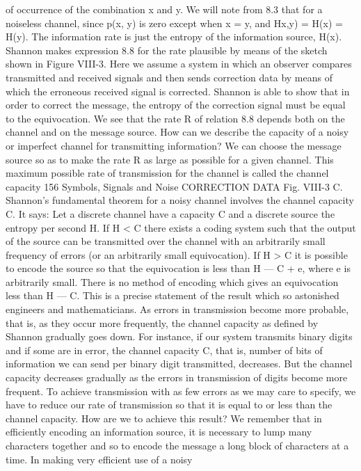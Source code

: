 {{{{{{{{of occurrence of the combination x and y. We will note from
8.3 that for a noiseless channel, since p(x, y) is zero except when
x = y, and H{x,y) = H(x) = H(y). The information rate is just
the entropy of the information source, H(x).
Shannon makes expression 8.8 for the rate plausible by means
of the sketch shown in Figure VIII-3. Here we assume a system in
which an observer compares transmitted and received signals and
then sends correction data by means of which the erroneous
received signal is corrected. Shannon is able to show that in order
to correct the message, the entropy of the correction signal must
be equal to the equivocation.
We see that the rate R of relation 8.8 depends both on the
channel and on the message source. How can we describe the
capacity of a noisy or imperfect channel for transmitting information?
We can choose the message source so as to make the rate R
as large as possible for a given channel. This maximum possible
rate of transmission for the channel is called the channel capacity
156 Symbols, Signals and Noise
CORRECTION DATA
Fig. VIII-3
C. Shannon’s fundamental theorem for a noisy channel involves
the channel capacity C. It says:
Let a discrete channel have a capacity C and a discrete source the
entropy per second H. If H < C there exists a coding system such that the
output of the source can be transmitted over the channel with an arbitrarily
small frequency of errors (or an arbitrarily small equivocation). If H > C
it is possible to encode the source so that the equivocation is less than
H — C + e, where e is arbitrarily small. There is no method of encoding
which gives an equivocation less than H — C.
This is a precise statement of the result which so astonished
engineers and mathematicians. As errors in transmission become
more probable, that is, as they occur more frequently, the channel
capacity as defined by Shannon gradually goes down. For instance,
if our system transmits binary digits and if some are in error, the
channel capacity C, that is, number of bits of information we can
send per binary digit transmitted, decreases. But the channel
capacity decreases gradually as the errors in transmission of digits
become more frequent. To achieve transmission with as few errors
as we may care to specify, we have to reduce our rate of transmission
so that it is equal to or less than the channel capacity.
How are we to achieve this result? We remember that in efficiently
encoding an information source, it is necessary to lump
many characters together and so to encode the message a long
block of characters at a time. In making very efficient use of a noisy
}}}}}}}}}
